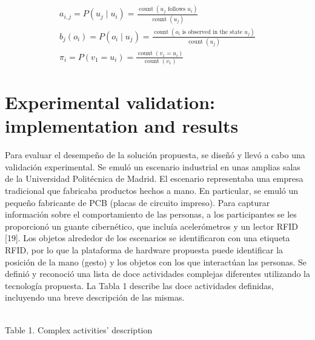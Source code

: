 \documentclass[10pt]{article}
\begin{document}
$$
\begin{gathered}
a_{i, j}=P\left(u_{j} \mid u_{i}\right)=\frac{\operatorname{count}\left(u_{j} \text { follows } u_{i}\right)}{\operatorname{count}\left(u_{j}\right)} \\
b_{j}\left(o_{i}\right)=P\left(o_{i} \mid u_{j}\right)=\frac{\operatorname{count}\left(o_{i} \text { is observed in the state } u_{j}\right)}{\operatorname{count}\left(u_{j}\right)} \\
\pi_{i}=P\left(v_{1}=u_{i}\right)=\frac{\operatorname{count}\left(v_{1}=u_{i}\right)}{\operatorname{count}\left(v_{1}\right)}
\end{gathered}
$$

\section{Experimental validation: implementation and results}
Para evaluar el desempeño de la solución propuesta, se diseñó y llevó a cabo una validación experimental. Se emuló un escenario industrial en unas amplias salas de la Universidad Politécnica de Madrid. El escenario representaba una empresa tradicional que fabricaba productos hechos a mano. En particular, se emuló un pequeño fabricante de PCB (placas de circuito impreso). Para capturar información sobre el comportamiento de las personas, a los participantes se les proporcionó un guante cibernético, que incluía acelerómetros y un lector RFID [19]. Los objetos alrededor de los escenarios se identificaron con una etiqueta RFID, por lo que la plataforma de hardware propuesta puede identificar la posición de la mano (gesto) y los objetos con los que interactúan las personas. Se definió y reconoció una lista de doce actividades complejas diferentes utilizando la tecnología propuesta. La Tabla 1 describe las doce actividades definidas, incluyendo una breve descripción de las mismas. 

\\

Table 1. Complex activities' description
\end{document}
